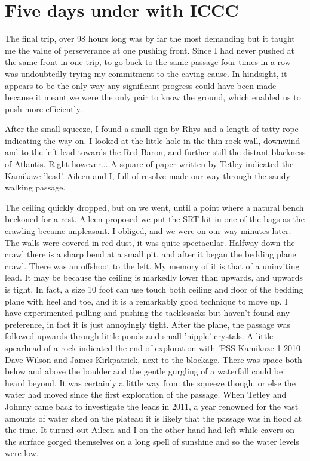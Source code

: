\section{Five days under with ICCC}
The final trip, over 98 hours long was by far the most demanding but it taught me the value of perseverance at one pushing front. Since I had never pushed at the same front in one trip, to go back to the same passage four times in a row was undoubtedly trying my commitment to the caving cause. In hindsight, it appears to be the only way any significant progress could have been made because it meant we were the only pair to know the ground, which enabled us to push more efficiently.

After the small squeeze, I found a small sign by Rhys and a length of tatty rope indicating the way on. I looked at the little hole in the thin rock wall, downwind and to the left lead towards the Red Baron, and further still the distant blackness of Atlantis. Right however... A square of paper written by Tetley indicated the Kamikaze 'lead'.  Aileen and I, full of resolve made our way through the sandy walking passage.

The ceiling quickly dropped, but on we went, until a point where a natural bench beckoned for a rest. Aileen proposed we put the SRT kit in one of the bags as the crawling became unpleasant. I obliged, and we were on our way minutes later. The walls were covered in red dust, it was quite spectacular. Halfway down the crawl there is a sharp bend at a small pit, and after it began the bedding plane crawl. There was an offshoot to the left. My memory of it is that of a uninviting lead. It may be because the ceiling is markedly lower than upwards, and upwards is tight. In fact, a size 10 foot can use touch both ceiling and floor of the bedding plane with heel and toe, and it is a remarkably good technique to move up. I have experimented pulling and pushing the tacklesacks but haven't found any preference, in fact it is just annoyingly tight. After the plane, the passage was followed upwards through little ponds and small 'nipple' crystals. A little spearhead of a rock indicated the end of exploration with 'PSS Kamikaze 1 2010 Dave Wilson and James Kirkpatrick, next to the blockage.
There was space both below and above the boulder and the gentle gurgling of a waterfall could be heard beyond. It was certainly a little way from the squeeze though, or else the water had moved since the first exploration of the passage. When Tetley and Johnny came back to investigate the leads in 2011, a year renowned for the vast amounts of water shed on the plateau it is likely that the passage was in flood at the time. It turned out Aileen and I on the other hand had left while cavers on the surface gorged themselves on a long spell of sunshine and so the water levels were low.

